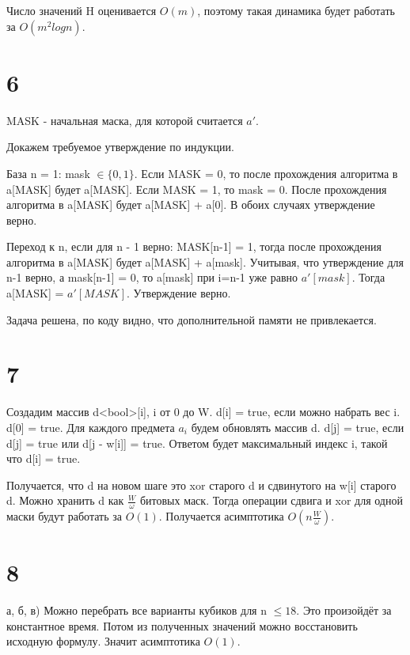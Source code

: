 \documentclass{extarticle}
\begin{document}
Число значений H оценивается $O(m)$, поэтому такая динамика будет работать за $O(m^2 log n)$.

\section*{6}
MASK - начальная маска, для которой считается $a'$.

Докажем требуемое утверждение по индукции.

База n = 1: mask $\in \{0, 1\}$. Если MASK = 0, то после прохождения алгоритма в a[MASK] будет a[MASK]. Если MASK = 1, то mask = 0. После прохождения алгоритма в a[MASK] будет a[MASK] + a[0]. В обоих случаях утверждение верно.

Переход к n, если для n - 1 верно: MASK[n-1] = 1, тогда после прохождения алгоритма в a[MASK] будет a[MASK] + a[mask]. Учитывая, что утверждение для n-1 верно, а mask[n-1] = 0, то a[mask] при i=n-1 уже равно $a'[mask]$. Тогда a[MASK] = $a'[MASK]$. Утверждение верно.

Задача решена, по коду видно, что дополнительной памяти не привлекается.

\section*{7}
Создадим массив d<bool>[i], i от 0 до W. d[i] = true, если можно набрать вес i. d[0] = true. Для каждого предмета $a_i$ будем обновлять массив d. d[j] = true, если d[j] = true или d[j - w[i]] = true. Ответом будет максимальный индекс i, такой что d[i] = true.

Получается, что d на новом шаге это xor старого d и сдвинутого на w[i] старого d. Можно хранить d как $\frac{W}{\omega}$ битовых маск. Тогда операции сдвига и xor для одной маски будут работать за $O(1)$. Получается асимптотика $O(n\frac{W}{\omega})$.

\section*{8}

а, б, в) Можно перебрать все варианты кубиков для n $\leq 18$. Это произойдёт за константное время. Потом из полученных значений можно восстановить исходную формулу. Значит асимптотика $O(1)$.
\end{document}
